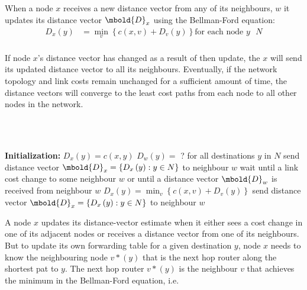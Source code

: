 \documentclass[12pt letter]{report}
\begin{document}
When a node $x$ receives a new distance vector from any of its
neighbours, $w$ it updates its distance vector $\mbold{D}_x$ using
the Bellman-Ford equation:
\begin{align*}
  D_x \left( y \right) &=  \min_v \left\{ c \left( x, v \right) + D_v
  \left( y \right)   \right\} \text{for each node $y$ $N$}  \\
\end{align*}

If node $x$'s distance vector has changed as a result of then update,
the $x$ will send its updated distance vector to all its neighbours.
Eventually, if the network topology and link costs remain unchanged
for a sufficient amount of time, the distance vectors will converge
to the least cost paths from each node to all other nodes in the network.

\begin{algorithm}[H]
  \caption{Distance Vector (DV) Algorithm}
  \Comment{}\\
   \\
  \begin{algorithmic}[1]
    \State \textbf{Initialization:}
    \State $D_x \left( y \right) = c \left( x, y \right) $
    \State $D_w \left( y \right) = $ ? for all destinations $y$ in $N$
    \EndFor
    \State send distance vector $\mbold{D}_x = \left\{ D_x \left( y
    \right) : y \in N \right\} $ to neighbour $w$
    \EndFor
    \EndFor
    \State
    \State wait until a link cost change to some neighbour $w$ or
    until a distance vector $\mbold{D}_w$ is received from neighbour $w$
    \State $D_x \left( y \right) = \min_v \left\{ c \left( x, v
    \right) + D_v \left( y \right)   \right\}  $
    \EndFor
    \State send distance vector $\mbold{D}_x = \left\{ D _x \left( y
    \right) : y \in N \right\} $ to neighbour $w$
    \EndFor
    \EndIf
    \EndWhile
  \end{algorithmic}
\end{algorithm}

A node $x$ updates its distance-vector estimate when it either sees a
cost change in one of its adjacent nodes or receives a distance
vector from one of its neighbours. But to update its own forwarding
table for a given destination $y$, node $x$ needs to know the
neighbouring node $v*\left( y \right) $ that is the next hop router
along the shortest pat to $y$. The next hop router $v*\left( y
\right) $ is the neighbour $v$ that achieves the minimum in the
Bellman-Ford equation, i.e.
\end{document}
